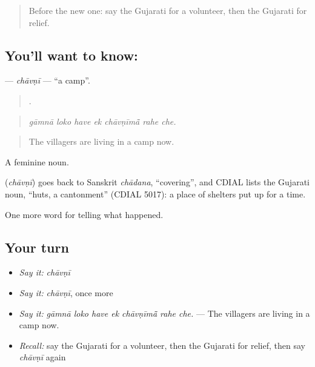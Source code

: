 \label{lesson:GU-C306-chavni}



\begin{quote}
Before the new one: say the Gujarati for a volunteer, then the Gujarati for relief.
\end{quote}

\subsection*{You'll want to know: }
\textbf{} — \emph{chāvṇī} — \textquotedblleft{}a camp\textquotedblright{}.

\begin{quote}
      .
\end{quote}

\begin{quote}
\emph{gāmnā loko have ek chāvṇīmā̃ rahe che.}
\end{quote}

\begin{quote}
The villagers are living in a camp now.
\end{quote}

A feminine noun.

\begin{cousinweb}
\textbf{} (\emph{chāvṇī}) goes back to Sanskrit \emph{chādana}, \textquotedblleft{}covering\textquotedblright{}, and CDIAL lists the Gujarati noun, \textquotedblleft{}huts, a cantonment\textquotedblright{} (CDIAL 5017): a place of shelters put up for a time.
\end{cousinweb}

\begin{grammarlens}[title={What you've built}]
One more word for telling what happened.
\end{grammarlens}

\subsection*{Your turn}
\begin{itemize}
\raggedright
  \item \emph{Say it:} \emph{chāvṇī}
  \item \emph{Say it:} \emph{chāvṇī}, once more
  \item \emph{Say it:} \emph{gāmnā loko have ek chāvṇīmā̃ rahe che.} — The villagers are living in a camp now.
  \item \emph{Recall:} say the Gujarati for a volunteer, then the Gujarati for relief, then say \emph{chāvṇī} again
\end{itemize}

